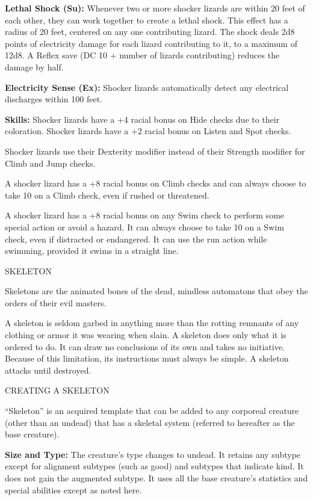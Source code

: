 \documentclass{article}
\begin{document}
\textbf{Lethal Shock (Su):} Whenever two or more shocker lizards are within 20 
feet of each other, they can work together to create a lethal shock. This effect 
has a radius of 20 feet, centered on any one contributing lizard. The shock deals 
2d8 points of electricity damage for each lizard contributing to it, to a maximum 
of 12d8. A Reflex save (DC 10 + number of lizards contributing) reduces the damage 
by half.

\textbf{Electricity Sense (Ex):} Shocker lizards automatically detect any electrical 
discharges within 100 feet.

\textbf{Skills:} Shocker lizards have a +4 racial bonus on Hide checks due to their 
coloration. Shocker lizards have a +2 racial bonus on Listen and Spot checks.

Shocker lizards use their Dexterity modifier instead of their Strength modifier 
for Climb and Jump checks.

A shocker lizard has a +8 racial bonus on Climb checks and can always choose to 
take 10 on a Climb check, even if rushed or threatened.

A shocker lizard has a +8 racial bonus on any Swim check to perform some special 
action or avoid a hazard. It can always choose to take 10 on a Swim check, even 
if distracted or endangered. It can use the run action while swimming, provided 
it swims in a straight line.

\vspace{12pt}
{\LARGE{}SKELETON}

Skeletons are the animated bones of the dead, mindless automatons that obey the 
orders of their evil masters.

A skeleton is seldom garbed in anything more than the rotting remnants of any clothing 
or armor it was wearing when slain. A skeleton does only what it is ordered to 
do. It can draw no conclusions of its own and takes no initiative. Because of this 
limitation, its instructions must always be simple. A skeleton attacks until destroyed.

CREATING A SKELETON

``Skeleton'' is an acquired template that can be added to any corporeal creature 
(other than an undead) that has a skeletal system (referred to hereafter as the 
base creature).

\textbf{Size and Type:} The creature's type changes to undead. It retains any subtype 
except for alignment subtypes (such as good) and subtypes that indicate kind. It 
does not gain the augmented subtype. It uses all the base creature's statistics 
and special abilities except as noted here.
\end{document}
